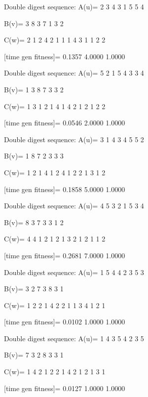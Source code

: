 Double digest sequence:
A(u)=
     2     3     4     3     1     5     5     4

B(v)=
     3     8     3     7     1     3     2

C(w)=
     2     1     2     4     2     1     1     1     4     3     1     1     2     2

[time gen fitness]=
    0.1357    4.0000    1.0000

Double digest sequence:
A(u)=
     5     2     1     5     4     3     3     4

B(v)=
     1     3     8     7     3     3     2

C(w)=
     1     3     1     2     1     4     1     4     2     1     2     1     2     2

[time gen fitness]=
    0.0546    2.0000    1.0000

Double digest sequence:
A(u)=
     3     1     4     3     4     5     5     2

B(v)=
     1     8     7     2     3     3     3

C(w)=
     1     2     1     4     1     2     4     1     2     2     1     3     1     2

[time gen fitness]=
    0.1858    5.0000    1.0000

Double digest sequence:
A(u)=
     4     5     3     2     1     5     3     4

B(v)=
     8     3     7     3     3     1     2

C(w)=
     4     4     1     2     1     2     1     3     2     1     2     1     1     2

[time gen fitness]=
    0.2681    7.0000    1.0000

Double digest sequence:
A(u)=
     1     5     4     4     2     3     5     3

B(v)=
     3     2     7     3     8     3     1

C(w)=
     1     2     2     1     4     2     2     1     1     3     4     1     2     1

[time gen fitness]=
    0.0102    1.0000    1.0000

Double digest sequence:
A(u)=
     1     4     3     5     4     2     3     5

B(v)=
     7     3     2     8     3     3     1

C(w)=
     1     4     2     1     2     2     1     4     2     1     2     1     3     1

[time gen fitness]=
    0.0127    1.0000    1.0000


